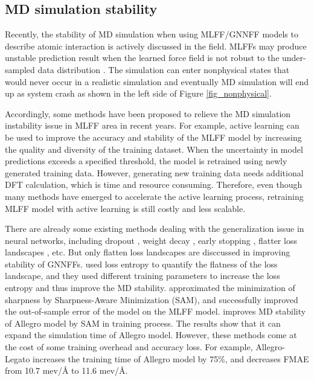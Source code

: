 \subsection{MD simulation stability}

Recently, the stability of MD simulation when using MLFF/GNNFF models to describe atomic interaction is actively discussed in the field. MLFFs may produce unstable prediction result when the learned force field is not robust to the under-sampled data distribution \citep{orlov_nanoscale_2015, rogacheva_non-stoichiometry_2006, dubey_stoichiometric_2019, kostenko_vacancy_2021}. The simulation can enter nonphysical states that would never occur in a realistic simulation and eventually MD simulation will end up as system crash as shown in the left side of Figure \ref{fig_nonphysical}. 

Accordingly, some methods have been proposed to relieve the MD simulation instability issue in MLFF area in recent years. For example, active learning \citep{vandermause_--fly_2020, xie_bayesian_2021, vandermause_active_2022, xie_uncertainty-aware_2023} can be used to improve the accuracy and stability of the MLFF model by increasing the quality and diversity of the training dataset. When the uncertainty in model predictions exceeds a specified threshold, the model is retrained using newly generated training data. However, generating new training data needs additional DFT calculation, which is time and resource consuming. Therefore, even though many methods have emerged to accelerate the active learning process, retraining MLFF model with active learning is still costly and less scalable.

There are already some existing methods dealing with the generalization issue in neural networks, including dropout \citep{Dropout}, weight decay \citep{weightdecay}, early stopping \citep{earlystop}, flatter loss landscapes \citep{keskar_large-batch_2017, dziugaite_computing_2017, jiang_fantastic_2020, vita_data_2023}, etc. But only flatten loss landscapes are disccussed in improving stability of GNNFFs.
\citeauthor{vita_data_2023} used loss entropy to quantify the flatness of the loss landscape, and they used different training parameters to increase the loss entropy and thus improve the MD stability.
\citeauthor{foret_sharpness-aware_2021} approximated the minimization of sharpness by Sharpness-Aware Minimization (SAM), and successfully improved the out-of-sample error of the model on the MLFF model.
\citeauthor{ibayashi_allegro-legato_2023} improves MD stability of Allegro model by SAM in training process. The results show that it can expand the simulation time of Allegro model. However, these methods come at the cost of some training overhead and accuracy loss. For example, Allegro-Legato increases the training time of Allegro model by 75\%, and decreases FMAE from 10.7 mev/Å to 11.6 mev/Å.

